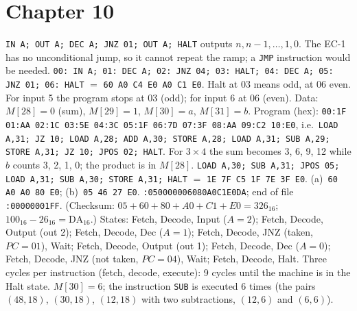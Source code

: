 \section*{Chapter 10}
 \texttt{IN A; OUT A; DEC A; JNZ 01; OUT A; HALT} outputs $n,n-1,\dots,1,0$. The EC-1 has no unconditional jump, so it cannot repeat the ramp; a \texttt{JMP} instruction would be needed.
 \texttt{00: IN A; 01: DEC A; 02: JNZ 04; 03: HALT; 04: DEC A; 05: JNZ 01; 06: HALT} $=$ \texttt{60 A0 C4 E0 A0 C1 E0}. Halt at 03 means odd, at 06 even. For input 5 the program stops at 03 (odd); for input 6 at 06 (even).
 Data: $M[28]=0$ (sum), $M[29]=1$, $M[30]=a$, $M[31]=b$. Program (hex): \texttt{00:1F 01:AA 02:1C 03:5E 04:3C 05:1F 06:7D 07:3F 08:AA 09:C2 10:E0}, i.e.\ \texttt{LOAD A,31; JZ 10; LOAD A,28; ADD A,30; STORE A,28; LOAD A,31; SUB A,29; STORE A,31; JZ 10; JPOS 02; HALT}. For $3\times4$ the sum becomes 3, 6, 9, 12 while $b$ counts 3, 2, 1, 0; the product is in $M[28]$.
 \texttt{LOAD A,30; SUB A,31; JPOS 05; LOAD A,31; SUB A,30; STORE A,31; HALT} $=$ \texttt{1E 7F C5 1F 7E 3F E0}.
 (a)~\texttt{60 A0 A0 80 E0}; (b)~\texttt{05 46 27 E0}.
 \texttt{:050000006080A0C1E0DA}; end of file \texttt{:00000001FF}. (Checksum: $05+60+80+A0+C1+E0=326_{16}$; $100_{16}-26_{16}=\mathrm{DA}_{16}$.)
 States: Fetch, Decode, Input ($A=2$); Fetch, Decode, Output (out 2); Fetch, Decode, Dec ($A=1$); Fetch, Decode, JNZ (taken, $PC=01$), Wait; Fetch, Decode, Output (out 1); Fetch, Decode, Dec ($A=0$); Fetch, Decode, JNZ (not taken, $PC=04$), Wait; Fetch, Decode, Halt.
 Three cycles per instruction (fetch, decode, execute): 9 cycles until the machine is in the Halt state.
 $M[30]=6$; the instruction \texttt{SUB} is executed 6 times (the pairs $(48,18)$, $(30,18)$, $(12,18)$ with two subtractions, $(12,6)$ and $(6,6)$).
